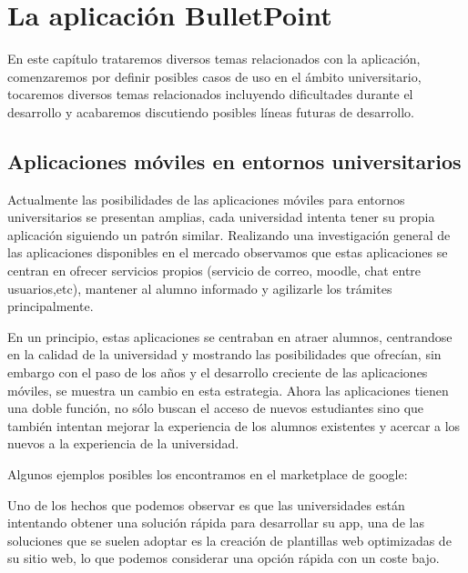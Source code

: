 %
%
%

\chapter{La aplicación BulletPoint} \label{chap:laaplicacion} 

En este capítulo trataremos diversos temas relacionados con la aplicación, comenzaremos por definir posibles casos de uso en el ámbito universitario, tocaremos diversos temas relacionados incluyendo dificultades durante el desarrollo y acabaremos discutiendo posibles líneas futuras de desarrollo.

 
\section{Aplicaciones móviles en entornos universitarios}


Actualmente las posibilidades de las aplicaciones móviles para entornos universitarios se presentan amplias, cada universidad intenta tener su propia aplicación siguiendo un patrón similar. Realizando una investigación general de las aplicaciones disponibles en el mercado observamos que estas aplicaciones se centran en ofrecer servicios propios (servicio de correo, moodle, chat entre usuarios,etc), mantener al alumno informado y agilizarle los trámites principalmente. 

En un principio, estas aplicaciones se centraban en atraer alumnos, centrandose en la calidad de la universidad y mostrando las posibilidades que ofrecían, sin embargo con el paso de los años y el desarrollo creciente de las aplicaciones móviles, se muestra un cambio en esta estrategia. Ahora las aplicaciones tienen una doble función, no sólo buscan el acceso de nuevos estudiantes sino que también intentan mejorar la experiencia de los alumnos existentes y acercar a los nuevos a la experiencia de la universidad. 

Algunos ejemplos posibles los encontramos en el marketplace de google:


Uno de los hechos que podemos observar es que las universidades están intentando obtener una solución rápida para desarrollar su app, una de las soluciones que se suelen adoptar es la creación de plantillas web optimizadas de su sitio web, lo que podemos considerar una opción rápida con un coste bajo.

